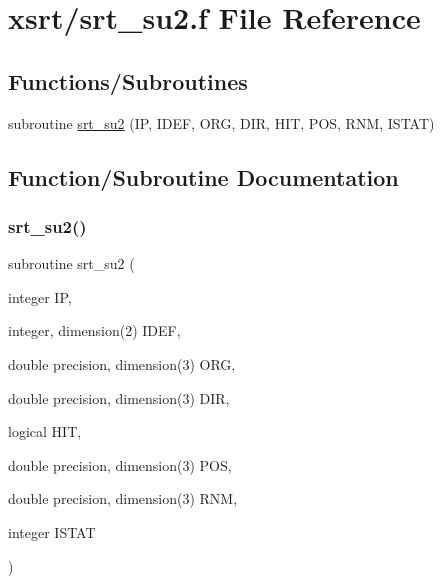 \hypertarget{srt__su2_8f}{}\section{xsrt/srt\+\_\+su2.f File Reference}
\label{srt__su2_8f}
\subsection*{Functions/\+Subroutines}
\begin{DoxyCompactItemize}
\item 
subroutine \hyperlink{srt__su2_8f_a019258ed0a05212da474224d6b80a096}{srt\+\_\+su2} (IP, I\+D\+EF, O\+RG, D\+IR, H\+IT, P\+OS, R\+NM, I\+S\+T\+AT)
\end{DoxyCompactItemize}


\subsection{Function/\+Subroutine Documentation}
\mbox{\label{srt__su2_8f_a019258ed0a05212da474224d6b80a096}} 
\subsubsection{\texorpdfstring{srt\+\_\+su2()}{srt\_su2()}}
{\footnotesize\ttfamily subroutine srt\+\_\+su2 (\begin{DoxyParamCaption}\item[{integer}]{IP,  }\item[{integer, dimension(2)}]{I\+D\+EF,  }\item[{double precision, dimension(3)}]{O\+RG,  }\item[{double precision, dimension(3)}]{D\+IR,  }\item[{logical}]{H\+IT,  }\item[{double precision, dimension(3)}]{P\+OS,  }\item[{double precision, dimension(3)}]{R\+NM,  }\item[{integer}]{I\+S\+T\+AT }\end{DoxyParamCaption})}

